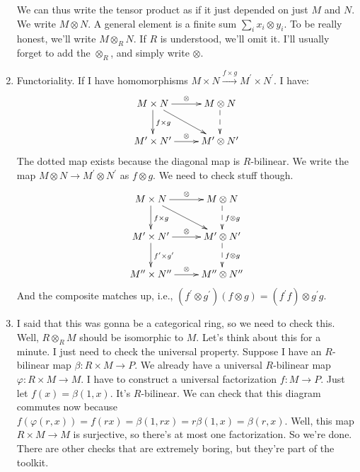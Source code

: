 \documentclass{amsart}
\theoremstyle{theorem}
\theoremstyle{definition}
\begin{document}
\begin{enumerate}
We can thus write the tensor product as if it just depended on just $M$ and $N$. We write $M\otimes N$. A general element is a finite sum $\sum_i x_i\otimes y_i$. To be really honest, we'll write $M\otimes_R N$. If $R$ is understood, we'll omit it. I'll usually forget to add the $\otimes_R$, and simply write $\otimes$.
\item Functoriality. If I have homomorphisms $M\times N\xrightarrow{f\times g}M^\prime\times N^\prime$. I have:
\begin{equation*}
\xymatrix{M\times N\ar[d]^{f\times g}\ar[r]^\otimes\ar[dr] & M\otimes N\ar@{-->}[d]\\
M^\prime\times N^\prime\ar[r]^\otimes & M^\prime\otimes N^\prime}
\end{equation*}
The dotted map exists because the diagonal map is $R$-bilinear. We write the map $M\otimes N\to M^\prime \otimes N^\prime$ as $f\otimes g$. We need to check stuff though.
\begin{equation*}
\xymatrix{M\times N\ar[d]^{f\times g}\ar[r]^\otimes\ar[dr] & M\otimes N\ar@{-->}[d]^{f\otimes g}\\
M^\prime\times N^\prime\ar[r]^\otimes\ar[d]^{f^\prime\times g^\prime} & M^\prime\otimes N^\prime\ar@{-->}[d]^{f\otimes g}\\
M^{\prime\prime}\times N^{\prime\prime}\ar[r]^\otimes & M^{\prime\prime}\otimes N^{\prime\prime}}
\end{equation*}
And the composite matches up, i.e., $(f^\prime\otimes g^\prime)(f\otimes g)=(f^\prime f)\otimes g^\prime g$.
\item I said that this was gonna be a categorical ring, so we need to check this. Well, $R\otimes_R M$ should be isomorphic to $M$. Let's think about this for a minute. I just need to check the universal property. Suppose I have an $R$-bilinear map $\beta:R\times M\to P$. We already have a universal $R$-bilinear map $\varphi:R\times M\to M$. I have to construct a universal factorization $f:M\to P$. Just let $f(x)=\beta(1,x)$. It's $R$-bilinear. We can check that this diagram commutes now because $f(\varphi(r,x))=f(rx)=\beta(1,rx)=r\beta(1,x)=\beta(r,x)$. Well, this map $R\times M\to M$ is surjective, so there's at most one factorization. So we're done. There are other checks that are extremely boring, but they're part of the toolkit.


\end{enumerate}
\end{document}
